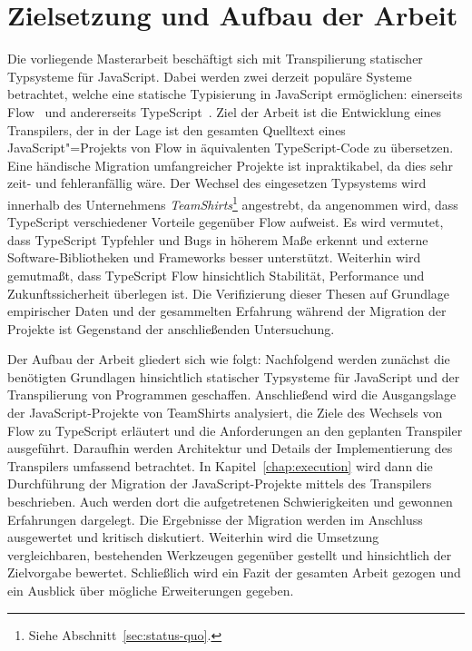 \section{Zielsetzung und Aufbau der Arbeit}

Die vorliegende Masterarbeit beschäftigt sich mit Transpilierung statischer Typsysteme für JavaScript. Dabei werden zwei derzeit populäre Systeme betrachtet, welche eine statische Typisierung in JavaScript ermöglichen: einerseits Flow~\autocite{FLOW:PAPER} und andererseits TypeScript~\autocite{TYPESCRIPT_SPEC}. Ziel der Arbeit ist die Entwicklung eines Transpilers, der in der Lage ist den gesamten Quelltext eines JavaScript"=Projekts von Flow in äquivalenten TypeScript-Code zu übersetzen. Eine händische Migration umfangreicher Projekte ist inpraktikabel, da dies sehr zeit- und fehleranfällig wäre. Der Wechsel des eingesetzen Typsystems wird innerhalb des Unternehmens \textit{TeamShirts}\footnote{Siehe Abschnitt~\ref{sec:status-quo}.} angestrebt, da angenommen wird, dass TypeScript verschiedener Vorteile gegenüber Flow aufweist. Es wird vermutet, dass TypeScript Typfehler und Bugs in höherem Maße erkennt und externe Software-Bibliotheken und Frameworks besser unterstützt. Weiterhin wird gemutmaßt, dass TypeScript Flow hinsichtlich Stabilität, Performance und Zukunftssicherheit überlegen ist. Die Verifizierung dieser Thesen auf Grundlage empirischer Daten und der gesammelten Erfahrung während der Migration der Projekte ist Gegenstand der anschließenden Untersuchung.

Der Aufbau der Arbeit gliedert sich wie folgt: Nachfolgend werden zunächst die benötigten Grundlagen hinsichtlich statischer Typsysteme für JavaScript und der Transpilierung von Programmen geschaffen. Anschließend wird die Ausgangslage der JavaScript-Projekte von TeamShirts analysiert, die Ziele des Wechsels von Flow zu TypeScript erläutert und die Anforderungen an den geplanten Transpiler ausgeführt. Daraufhin werden Architektur und Details der Implementierung des Transpilers umfassend betrachtet. In Kapitel~\ref{chap:execution} wird dann die Durchführung der Migration der JavaScript-Projekte mittels des Transpilers beschrieben. Auch werden dort die aufgetretenen Schwierigkeiten und gewonnen Erfahrungen dargelegt. Die Ergebnisse der Migration werden im Anschluss ausgewertet und kritisch diskutiert. Weiterhin wird die Umsetzung vergleichbaren, bestehenden Werkzeugen gegenüber gestellt und hinsichtlich der Zielvorgabe bewertet. Schließlich wird ein Fazit der gesamten Arbeit gezogen und ein Ausblick über mögliche Erweiterungen gegeben.
